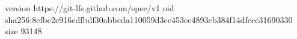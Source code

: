 version https://git-lfs.github.com/spec/v1
oid sha256:8cfbe2e916cdfbdf30abbcda110059d3cc453ee4893cb384f14dfccc31690330
size 93148
